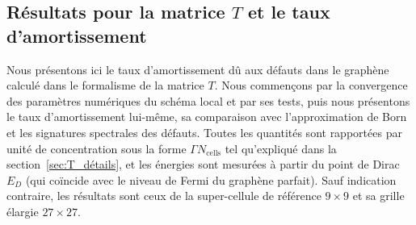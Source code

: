 \subsection{Résultats pour la matrice $T$ et le taux d'amortissement}\label{sec:T_results}

Nous présentons ici le taux d'amortissement dû aux défauts dans le graphène calculé dans le formalisme de la matrice $T$. Nous commençons par la convergence des paramètres numériques du schéma local et par ses tests, puis nous présentons le taux d'amortissement lui-même, sa comparaison avec l'approximation de Born et les signatures spectrales des défauts. Toutes les quantités sont rapportées par unité de concentration sous la forme $\Gamma N_\text{cells}$ tel qu'expliqué dans la section~\ref{sec:T_détails}, et les énergies sont mesurées à partir du point de Dirac $E_D$ (qui coïncide avec le niveau de Fermi du graphène parfait). Sauf indication contraire, les résultats sont ceux de la super-cellule de référence $9\times 9$ et sa grille élargie $27\times 27$.

\newpage
{}


